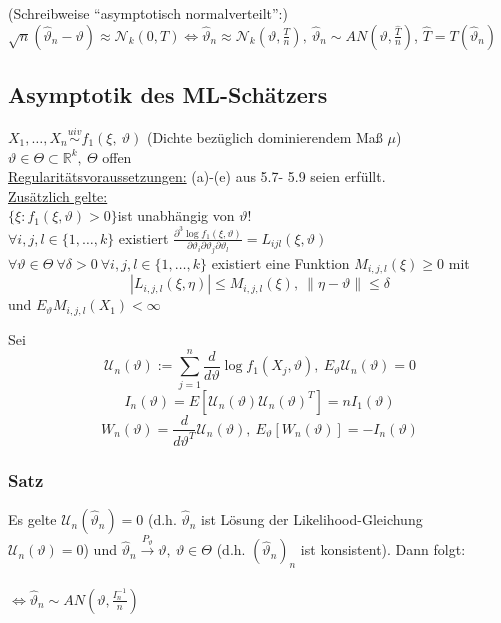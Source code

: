 \documentclass[a4paper,11pt,twoside,titlepage]{article}
\newcommand{\R}{{\mathbb R}}
\newcommand\NN{ \mathcal{N} } %
\newcommand\UU{ \mathcal{U} } %
\newcommand{\uiv}{\ensuremath{\stackrel{uiv}{\sim}}}
\begin{document}
(Schreibweise "`asymptotisch normalverteilt"':)\\
$\sqrt{n}(\hat{\vartheta}_n-\vartheta)\approx\NN_k(0,T)\Leftrightarrow \hat{\vartheta}_n\approx \NN_k(\vartheta,\frac{T}{n}),
\ \hat{\vartheta}_n\sim AN(\vartheta,\frac{\hat T}{n} )$, $\hat T=T(\hat\vartheta_n)$
\newpage
\subsection{Asymptotik des ML-Schätzers}
$X_1,\ldots,X_n\uiv f_1(\xi,\ \vartheta)$ (Dichte bezüglich dominierendem Maß $\mu$)\\
$\vartheta\in\Theta\subset\R^k,\ \Theta$ offen\\
\underline{Regularitätsvoraussetzungen:} (a)-(e) aus 5.7- 5.9 seien erfüllt.\\
\underline{Zusätzlich gelte:}\\
$\{\xi:f_1(\xi,\vartheta)>0\}$ist unabhängig von $\vartheta$! \\
$\forall i,j,l\in \{1,\ldots,k\}$ existiert $\frac{\partial^3 \log f_1(\xi,\vartheta)}{\partial \vartheta_i\partial\vartheta_j\partial\vartheta_l}
= L_{ijl}(\xi,\vartheta)$\\
$\forall\vartheta\in\Theta\ \forall\delta>0\ \forall i,j,l\in\{1,\ldots,k\}$ existiert eine Funktion $M_{i,j,l}(\xi)\geq 0$ mit $$\left|L_{i,j,l}(\xi,\eta)\right|\leq M_{i,j,l}(\xi),\ \left\|\eta-\vartheta\right\|\leq\delta$$ und $E_\vartheta M_{i,j,l}(X_1)<\infty$

Sei $$\UU_n(\vartheta):=\sum_{j=1}^n\frac{d}{d\vartheta}\log f_1(X_j,\vartheta),\ E_\vartheta \UU_n(\vartheta)=0$$
$$I_n(\vartheta)=E[\UU_n(\vartheta)\UU_n(\vartheta)^T]=nI_1(\vartheta)$$
$$W_n(\vartheta)=\frac{d}{d\vartheta^T}\UU_n(\vartheta),\ E_\vartheta[W_n(\vartheta)]=-I_n(\vartheta)$$

\subsubsection{Satz}
Es gelte $\UU_n(\hat\vartheta_n)=0$ (d.h. $\hat\vartheta_n$ ist Lösung der Likelihood-Gleichung\\ $\UU_n(\vartheta)=0$) und
$\hat\vartheta_n\stackrel{P_\vartheta}{\rightarrow}\vartheta,\ \vartheta\in\Theta$ (d.h. $(\hat\vartheta_n)_n$ ist konsistent). Dann folgt:\\
\framebox{\parbox{0.9\textwidth}{
$$\sqrt{n}(\hat\vartheta_n-\vartheta)\stackrel{D_\vartheta}{\rightarrow}\NN_k(0,I_1(\vartheta)^{-1})$$}}\\
$\Leftrightarrow \hat\vartheta_n\sim AN(\vartheta,\frac{I_n^{-1}}{n})$
\end{document}
